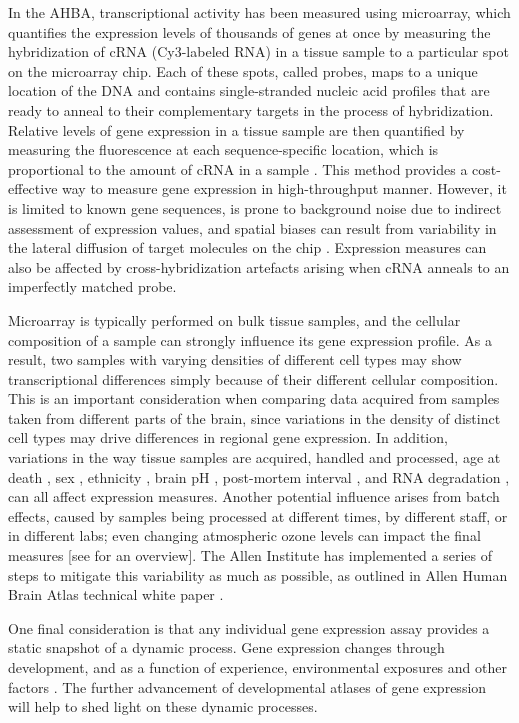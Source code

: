 In the AHBA, transcriptional activity has been measured using microarray, which quantifies the expression levels of thousands of genes at once by measuring the hybridization of cRNA (Cy3-labeled RNA) in a tissue sample to a  particular spot on the microarray chip. Each of these spots, called probes, maps to a unique location of the DNA and contains single-stranded nucleic acid profiles that are ready to anneal to their complementary targets in the process of hybridization. Relative levels of gene expression in a tissue sample are then quantified by measuring the fluorescence at each sequence-specific location, which is proportional to the amount of cRNA in a sample \citep{Tarca2006}. This method provides a cost-effective way to measure gene expression in high-throughput manner. However, it is limited to known gene sequences, is prone to background noise due to indirect assessment of expression values, and spatial biases can result from variability in the lateral diffusion of target molecules on the chip \citep{Steger2011}. Expression measures can also be affected by cross-hybridization artefacts arising when cRNA anneals to an imperfectly matched probe.

Microarray is typically performed on bulk tissue samples, and the cellular composition of a sample can strongly influence its gene expression profile. As a result, two samples with varying densities of different cell types may show transcriptional differences simply because of their different cellular composition. This is an important consideration when comparing data acquired from samples taken from different parts of the brain, since variations in the density of distinct cell types may drive differences in regional gene expression. In addition, variations in the way tissue samples are acquired, handled and processed, age at death \citep{Glass2013}, sex \citep{Berchtold2008,Trabzuni2013}, ethnicity \citep{Spielman2007}, brain pH \citep{Mexal2006}, post-mortem interval \citep{Zhu2017}, and RNA degradation \citep{Jaksik2015}, can all affect expression measures. Another potential influence arises from batch effects, caused by samples being processed at different times, by different staff, or in different labs; even changing atmospheric ozone levels can impact the final measures \citep{Fare2003} [see \citet{Scherer2009} for an overview]. The Allen Institute has implemented a series of steps to mitigate this variability as much as possible, as outlined in Allen Human Brain Atlas technical white paper \citep{AHBAdoc}.

One final consideration is that any individual gene expression assay provides a static snapshot of a dynamic process. Gene expression changes through development, and as a function of experience, environmental exposures and other factors \citep{Fraser2005,Choi2007,Berchtold2008,Cole2009,Birdsill2011,Naumova2012,Kumar2013}.
The further advancement of developmental atlases of gene expression \citep{Johnson2009,Colantuoni2011,Kang2011,Fertuzinhos2014,Bakken2016} will help to shed light on these dynamic processes.

